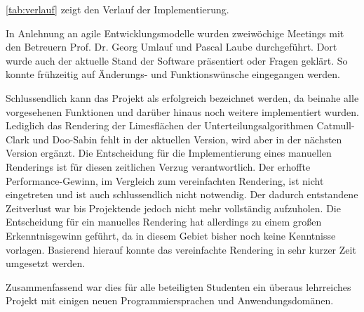 \autoref{tab:verlauf} zeigt den Verlauf der Implementierung.

In Anlehnung an agile Entwicklungsmodelle wurden zweiwöchige Meetings mit den Betreuern Prof. Dr. Georg Umlauf und Pascal Laube durchgeführt. 
Dort wurde auch der aktuelle Stand der Software präsentiert oder Fragen geklärt.
So konnte frühzeitig auf Änderungs- und Funktionswünsche eingegangen werden.

Schlussendlich kann das Projekt als erfolgreich bezeichnet werden, da beinahe alle vorgesehenen Funktionen und darüber hinaus noch weitere implementiert wurden.
Lediglich das Rendering der Limesflächen der Unterteilungsalgorithmen Catmull-Clark und Doo-Sabin fehlt in der aktuellen Version, wird aber in der nächsten Version ergänzt.
Die Entscheidung für die Implementierung eines manuellen Renderings ist für diesen zeitlichen Verzug verantwortlich.
Der erhoffte Performance-Gewinn, im Vergleich zum vereinfachten Rendering, ist nicht eingetreten und ist auch schlussendlich nicht notwendig.
Der dadurch entstandene Zeitverlust war bis Projektende jedoch nicht mehr vollständig aufzuholen.
Die Entscheidung für ein manuelles Rendering hat allerdings zu einem großen Erkenntnisgewinn geführt, da in diesem Gebiet bisher noch keine Kenntnisse vorlagen.
Basierend hierauf konnte das vereinfachte Rendering in sehr kurzer Zeit umgesetzt werden.

Zusammenfassend war dies für alle beteiligten Studenten ein überaus lehrreiches Projekt mit einigen neuen Programmiersprachen und Anwendungsdomänen.
